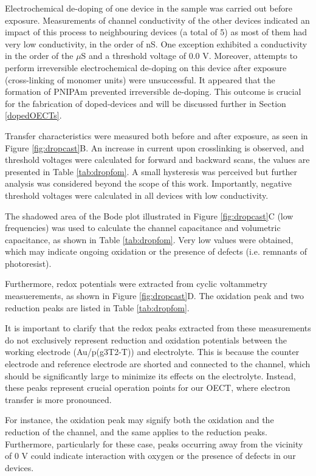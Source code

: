 Electrochemical de-doping of one device in the sample was carried out before exposure. Measurements of channel conductivity of the other devices indicated an impact of this process to neighbouring devices (a total of 5) as most of them had very low conductivity, in the order of nS. One exception exhibited a conductivity in the order of the $\mu$S and a threshold voltage of 0.0 V. Moreover, attempts to perform irreversible electrochemical de-doping on this device after exposure (cross-linking of monomer units) were unsuccessful. It appeared that the formation of PNIPAm prevented irreversible de-doping. This outcome is crucial for the fabrication of doped-devices and will be discussed further in Section \ref{dopedOECTs}.

Transfer characteristics were measured both before and after exposure, as seen in Figure \ref{fig:dropcast}B. An increase in current upon crosslinking is observed, and threshold voltages were calculated for forward and backward scans, the values are presented in Table \ref{tab:dropfom}. A small hysteresis was perceived but further analysis was considered beyond the scope of this work. Importantly, negative threshold voltages were calculated in all devices with low conductivity.

The shadowed area of the Bode plot illustrated in Figure \ref{fig:dropcast}C (low frequencies) was used to calculate the channel capacitance and volumetric capacitance, as shown in Table \ref{tab:dropfom}. Very low values were obtained, which may indicate ongoing oxidation or the presence of defects (i.e. remnants of photoresist). %

Furthermore, redox potentials were extracted from cyclic voltammetry measuerements, as shown in Figure \ref{fig:dropcast}D. The oxidation peak and two reduction peaks are listed in Table \ref{tab:dropfom}. 

It is important to clarify that the redox peaks extracted from these measurements do not exclusively represent reduction and oxidation potentials between the working electrode (Au/p(g3T2-T)) and electrolyte. This is because the counter electrode and reference electrode are shorted and connected to the channel, which should be significantly large to minimize its effects on the electrolyte. Instead, these peaks represent crucial operation points for our OECT, where electron transfer is more pronounced. 

For instance, the oxidation peak may signify both the oxidation and the reduction of the channel, and the same applies to the reduction peaks. Furthermore, particularly for these case, peaks occurring away from the vicinity of 0 V could indicate interaction with oxygen or the presence of defects in our devices.

